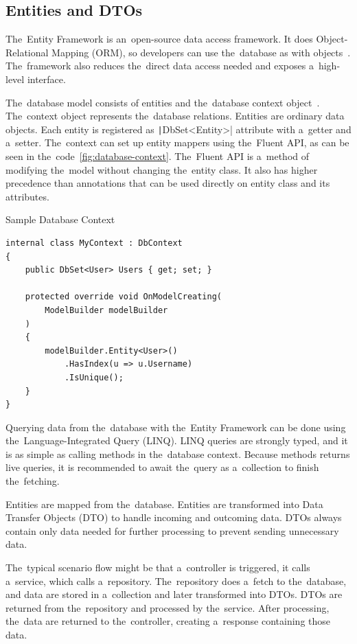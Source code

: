 \subsection{Entities and DTOs}

The~Entity Framework is an~open-source data access framework.
It does Object-Relational Mapping (ORM), so developers can use the~database as with objects~\cite{a2021_overview}.
The~framework also reduces the~direct data access needed and exposes a~high-level interface.

The~database model consists of entities and the~database context object~\cite{a2022_creating}.
The~context object represents the~database relations.
Entities are ordinary data objects.
Each entity is registered as \texttt|DbSet<Entity>| attribute with a~getter and a~setter.
The~context can set up entity mappers using the~Fluent API, as can be seen in the~code~\ref{fig:database-context}.
The~Fluent API is a~method of modifying the~model without changing the~entity class.
It also has higher precedence than annotations that can be used directly on entity class and its attributes.

\begin{listing}
    \caption{Sample Database Context}
    \label{fig:database-context}
    \begin{verbatim}
internal class MyContext : DbContext
{
    public DbSet<User> Users { get; set; }

    protected override void OnModelCreating(
        ModelBuilder modelBuilder
    )
    {
        modelBuilder.Entity<User>()
            .HasIndex(u => u.Username)
            .IsUnique();
    }
}
    \end{verbatim}
\end{listing}

Querying data from the~database with the~Entity Framework can be done using the~Language-Integrated Query (LINQ).
LINQ queries are strongly typed, and it is as simple as calling methods in the~database context.
Because methods returns live queries, it is recommended to await the~query as a~collection to finish the~fetching.

Entities are mapped from the~database.
Entities are transformed into Data Transfer Objects (DTO) to handle incoming and outcoming data.
DTOs always contain only data needed for further processing to prevent sending unnecessary data.

The~typical scenario flow might be that a~controller is triggered, it calls a~service, which calls a~repository.
The~repository does a~fetch to the~database, and data are stored in a~collection and later transformed into DTOs.
DTOs are returned from the~repository and processed by the~service.
After processing, the~data are returned to the~controller, creating a~response containing those data.

